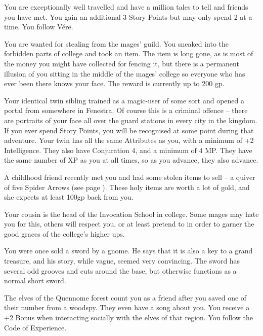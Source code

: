 \begin{multicols}{2}
\begin{list}{\addtocounter{list}{1}\textbf{:}}{\raggedleft}
  \item
  You are exceptionally well travelled and have a million tales to tell and friends you have met.
  You gain an additional 3 Story Points but may only spend 2 at a time.
  You follow V\'er\"e.

  \item
  You are wanted for stealing from the mages' guild.
You sneaked into the forbidden parts of \gls{college} and took an item.
The item is long gone, as is most of the money you might have collected for fencing it, but there is a permanent illusion of you sitting in the middle of the mages' \gls{college} so everyone who has ever been there knows your face.
The reward is currently up to 200 gp.

  \item
  Your identical twin sibling trained as a magic-user of some sort and opened a portal from somewhere in Fenestra.
  Of course this is a criminal offence -- there are portraits of your face all over the guard stations in every city in the kingdom.
  If you ever spend Story Points, you will be recognised at some point during that adventure.
  Your twin has all the same Attributes as you, with a minimum of +2 Intelligence.
  They also have Conjuration 4, and a minimum of 4 MP.
  They have the same number of XP as you at all times, so as you advance, they also advance.


  \item
  A childhood friend recently met you and had some stolen items to sell -- a quiver of five Spider Arrows (see page \pageref{spiderarrows}).
These holy items are worth a lot of gold, and she expects at least 100gp back from you.

  \item
  Your cousin is the head of the Invocation School in \gls{college}. Some mages may hate you for this, others will respect you, or at least pretend to in order to garner the good graces of the \gls{college}'s higher ups.

  \item
  You were once sold a sword by a gnome.
  He says that it is also a key to a grand treasure, and his story, while vague, seemed very convincing.
  The sword has several odd grooves and cuts around the base, but otherwise functions as a normal short sword.

  \item
  The elves of the Quennome forest count you as a friend after you saved one of their number from a woodspy.
  They even have a song about you.
  You receive a +2 Bonus when interacting socially with the elves of that region.
  You follow the Code of Experience.


\end{list}
\end{multicols}
